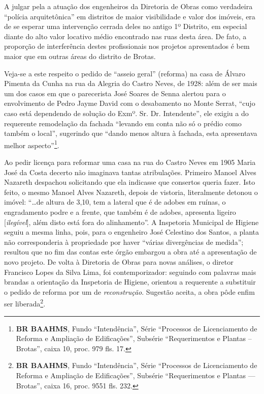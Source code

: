 
A julgar pela a atuação dos engenheiros da Diretoria de Obras como verdadeira ``polícia arquitetônica'' em distritos de maior visibilidade e valor dos imóveis\cite{almeida_victoria_1997, almeida_vitrinescomercio_2014}, era de se esperar uma intervenção cerrada deles no antigo 1º Distrito, em especial diante do alto valor locativo médio encontrado nas ruas desta área. De fato, a proporção de interferência destes profissionais nos projetos apresentados é bem maior que em outras áreas do distrito de Brotas.

Veja-se a este respeito o pedido de ``asseio geral'' (reforma) na casa de Álvaro Pimenta da Cunha na rua da Alegria do Castro Neves, de 1928: além de ser mais um dos casos em que o parecerista José Soares de Senna alertou para o envolvimento de Pedro Jayme David com o desabamento no Monte Serrat, ``cujo caso está dependendo de solução do Exmº. Sr. Dr. Intendente'', ele exigiu a do requerente remodelação da fachada ``levando em conta não só o prédio como também o local'', sugerindo que ``dando menos altura à fachada, esta apresentava melhor aspecto''\footnote{\textbf{BR BAAHMS}, Fundo ``Intendência'', Série ``Processos de Licenciamento de Reforma e Ampliação de Edificações'', Subsérie ``Requerimentos e Plantas – Brotas'', caixa 10, proc. 979 fls. 17.}.

Ao pedir licença para reformar uma casa na rua do Castro Neves em 1905 Maria José da Costa decerto não imaginava tantas atribulações. Primeiro Manoel Alves Nazareth despachou solicitando que ela indicasse que consertos queria fazer. Isto feito, o mesmo Manoel Alves Nazareth, depois de vistoria, literalmente detonou o imóvel: ``\dots de altura de 3,10, tem a lateral que é de adobes em ruínas, o engradamento podre e a frente, que também é de adobes, apresenta ligeiro [\textit{ilegível}], além disto está fora do alinhamento''. A Inspetoria Municipal de Higiene seguiu a mesma linha, pois, para o engenheiro José Celestino dos Santos, a planta não corresponderia à propriedade por haver ``várias divergências de medida''; resultou que no fim das contas este órgão embargou a obra até a apresentação de novo projeto. De volta à Diretoria de Obras para novas análises, o diretor Francisco Lopes da Silva Lima, foi contemporizador: seguindo com palavras mais brandas a orientação da Inspetoria de Higiene, orientou a requerente a substituir o pedido de reforma por um de \textit{reconstrução}. Sugestão aceita, a obra pôde enfim ser liberada\footnote{\textbf{BR BAAHMS}, Fundo ``Intendência'', Série ``Processos de Licenciamento de Reforma e Ampliação de Edificações'', Subsérie ``Requerimentos e Plantas --- Brotas'', caixa 16, proc. 9551 fls. 232.}.


